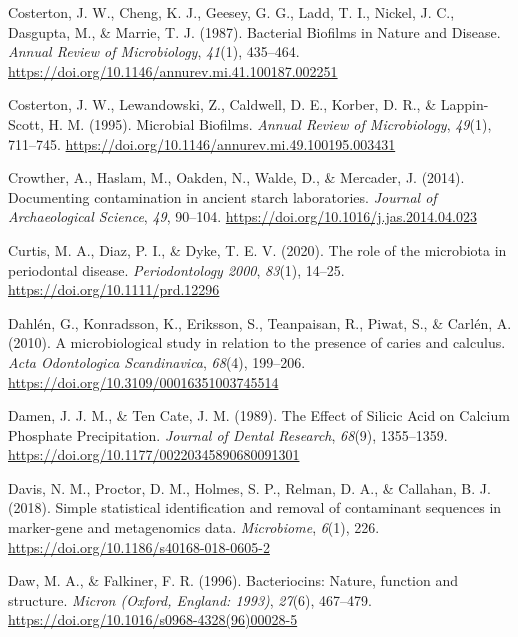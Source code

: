 \documentclass[
  letterpaper,
]{book}
\newlength{\cslhangindent}
\newlength{\cslentryspacingunit} %
\newenvironment{CSLReferences}[2] %
 {%
  \setlength{\parindent}{0pt}
  \ifodd #1
  \let\oldpar\par
  \def\par{\hangindent=\cslhangindent\oldpar}
  \fi
  \setlength{\parskip}{#2\cslentryspacingunit}
 }%
 {}
\begin{document}
\begin{CSLReferences}{1}{0}
\leavevmode{}%
Costerton, J. W., Cheng, K. J., Geesey, G. G., Ladd, T. I., Nickel, J.
C., Dasgupta, M., \& Marrie, T. J. (1987). Bacterial {Biofilms} in
{Nature} and {Disease}. \emph{Annual Review of Microbiology},
\emph{41}(1), 435--464.
\url{https://doi.org/10.1146/annurev.mi.41.100187.002251}

\leavevmode{}%
Costerton, J. W., Lewandowski, Z., Caldwell, D. E., Korber, D. R., \&
Lappin-Scott, H. M. (1995). Microbial {Biofilms}. \emph{Annual Review of
Microbiology}, \emph{49}(1), 711--745.
\url{https://doi.org/10.1146/annurev.mi.49.100195.003431}

\leavevmode{}%
Crowther, A., Haslam, M., Oakden, N., Walde, D., \& Mercader, J. (2014).
Documenting contamination in ancient starch laboratories. \emph{Journal
of Archaeological Science}, \emph{49}, 90--104.
\url{https://doi.org/10.1016/j.jas.2014.04.023}

\leavevmode{}%
Curtis, M. A., Diaz, P. I., \& Dyke, T. E. V. (2020). The role of the
microbiota in periodontal disease. \emph{Periodontology 2000},
\emph{83}(1), 14--25. \url{https://doi.org/10.1111/prd.12296}

\leavevmode{}%
Dahlén, G., Konradsson, K., Eriksson, S., Teanpaisan, R., Piwat, S., \&
Carlén, A. (2010). A microbiological study in relation to the presence
of caries and calculus. \emph{Acta Odontologica Scandinavica},
\emph{68}(4), 199--206. \url{https://doi.org/10.3109/00016351003745514}

\leavevmode{}%
Damen, J. J. M., \& Ten Cate, J. M. (1989). The {Effect} of {Silicic
Acid} on {Calcium Phosphate Precipitation}. \emph{Journal of Dental
Research}, \emph{68}(9), 1355--1359.
\url{https://doi.org/10.1177/00220345890680091301}

\leavevmode{}%
Davis, N. M., Proctor, D. M., Holmes, S. P., Relman, D. A., \& Callahan,
B. J. (2018). Simple statistical identification and removal of
contaminant sequences in marker-gene and metagenomics data.
\emph{Microbiome}, \emph{6}(1), 226.
\url{https://doi.org/10.1186/s40168-018-0605-2}

\leavevmode{}%
Daw, M. A., \& Falkiner, F. R. (1996). Bacteriocins: Nature, function
and structure. \emph{Micron (Oxford, England: 1993)}, \emph{27}(6),
467--479. \url{https://doi.org/10.1016/s0968-4328(96)00028-5}


\end{CSLReferences}
\end{document}
